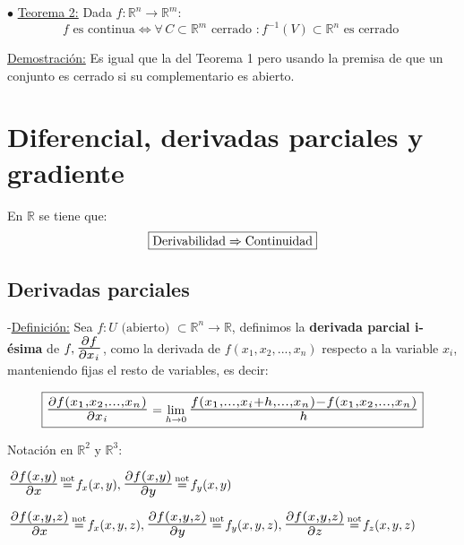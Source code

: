 \documentclass[12pt, titlepage]{article}
\newcommand{\eqc}[1]{\stackrel{\mathclap{\normalfont\mbox{\scriptsize{#1}}}}{=}}
\newcommand{\R}{\mathbb{R}}
\newcommand{\bfrac}[2]{\scalebox{1.4}{$\frac{#1}{#2}$}}
\newcommand{\definicion}{\noindent-\underline{Definición:} }
\newcommand{\teorema}[1][\!\!]{\noindent$\bullet$ \underline{Teorema #1:} }
\begin{document}
\teorema[2] Dada $f : \R^n \to \R^m$:
\[
\boxed{
f \text{ es continua} \iff \forall \, C \subset \R^m \text{ cerrado } : f^{-1} (V) \subset \R^n \text{ es 
cerrado }
}
\]
\vspace{0mm}

\underline{Demostración:} Es igual que la del Teorema 1 pero usando la premisa de que un conjunto es 
cerrado si su complementario es abierto.
\vspace{5mm}


\section{Diferencial, derivadas parciales y gradiente}
\vspace{3mm}

En $\R$ se tiene que:
\[
\boxed{
\text{Derivabilidad} \Rightarrow \text{Continuidad}
}
\vspace{3mm}
\]


\subsection{Derivadas parciales}
\vspace{5mm}

\definicion Sea $f : U \text{ (abierto) } \subset \R^n \to \R$, definimos la \textbf{derivada parcial i-ésima} de 
$f, \bfrac{\partial f}{\partial x_i}$, como la derivada de $f (x_1, x_2,..., x_n)$ respecto a la variable $x_i$, manteniendo fijas el resto de variables, es decir:

\[
\boxed{
\bfrac{\partial f (x_1, x_2,..., x_n)}{\partial x_i} = \displaystyle \lim_{h \to 0} \bfrac{f (x_1,..., x_i+h,...,x_n)  
- f (x_1, x_2,..., x_n)}{h}
}
\]
\vspace{3mm}

Notación en $\R^2$ y $\R^3$:
\vspace{3mm}

$\bfrac{\partial f (x, y)}{\partial x} \eqc{not} f_x (x, y), \bfrac{\partial f (x, y)}{\partial y} \eqc{not} f_y (x, y) 
$
\vspace{3mm}

$\bfrac{\partial f (x, y, z)}{\partial x} \eqc{not} f_x (x, y, z), \bfrac{\partial f (x, y, z)}{\partial y} \eqc{not} f_y (x, y, z) , \bfrac{\partial f (x, y, z)}{\partial z} \eqc{not} f_z (x, y, z)
$
\vspace{5mm}
\end{document}
